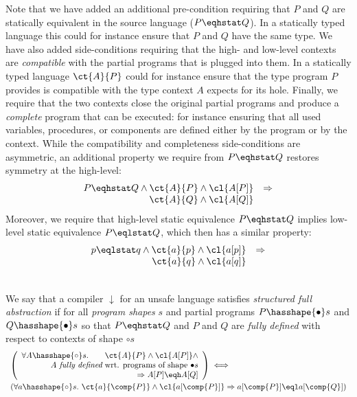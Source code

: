 \documentclass[10pt, conference, compsocconf, letterpaper, times]{IEEEtran}
\begin{document}
Note that we have added an additional pre-condition requiring that $P$
and $Q$ are statically equivalent in the source language ($P \eqhstat Q$).
In a statically typed language this could for instance ensure that $P$
and $Q$ have the same type.
We have also added side-conditions requiring that the high- and
low-level contexts are {\em compatible} with the partial programs that
is plugged into them.
In a statically typed language $\ct{A}{P}$ could for instance ensure
that the type program $P$ provides is compatible with the type context
$A$ expects for its hole.
Finally, we require that the two contexts close the original partial
programs and produce a {\em complete} program that can be executed:
for instance ensuring that all used variables, procedures, or
components are defined either by the program or by the context.
While the compatibility and completeness side-conditions are
asymmetric, an additional property we require from $P \eqhstat Q$
restores symmetry at the high-level:
\[
\begin{array}{rl}
P \eqhstat Q \land \ct{A}{P} \land \cl{A[P]} & \Rightarrow\\
                  \ct{A}{Q} \land \cl{A[Q]} &
\end{array}
\]
Moreover, we require that high-level static equivalence $P \eqhstat Q$
implies low-level static equivalence $P \eqlstat Q$, which then has a
similar property:
\[
\begin{array}{rl}
p \eqlstat q \land \ct{a}{p} \land \cl{a[p]} & \Rightarrow\\
                  \ct{a}{q} \land \cl{a[q]} &
\end{array}
\]


\begin{defn}\label{defn:sfa-detail}~\\
  We say that a compiler $\downarrow$ for an unsafe language
  satisfies {\em structured full abstraction} if for all
  {\em program shapes} $s$ and partial programs
    $P \hasshape{\bullet} s$ and $Q \hasshape{\bullet} s$ so that
    $P \eqhstat Q$ and
    $P$ and $Q$ are {\em fully defined} with respect to contexts of shape ${\circ}s$
\[
\begin{array}{l}
\left(\begin{array}{r}
\forall A \hasshape{\circ} s.\qquad \ct{A}{P} \land \cl{A[P]} \land\\
   A~\textit{fully defined}\text{ wrt. programs of shape }{\bullet}s\\
   \qquad\Rightarrow A[P] \eqh A[Q]
\end{array}\right)\iff\\[1.5em]
(\forall a \hasshape{\circ} s.~ \ct{a}{\comp{P}} \land \cl{a[\comp{P}]} \Rightarrow
  a[\comp{P}] \eql a[\comp{Q}])\\
\end{array}
\]
\end{defn}
\end{document}
